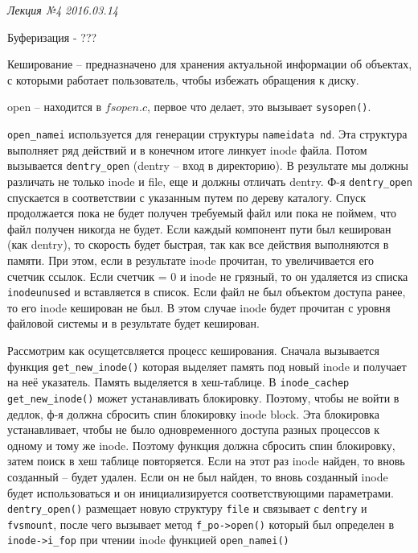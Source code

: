 \clearpage
\begin{flushright}
	\textit{Лекция №4}
	\textit{2016.03.14}
\end{flushright}

Буферизация - ???

Кеширование – предназначено для хранения актуальной информации об объектах, с которыми работает пользователь, чтобы избежать обращения к диску.

open – находится в $fsopen.c$, первое что делает, это вызывает \verb|sysopen()|. 

 

\verb|open_namei| используется для генерации структуры \verb|nameidata nd|. Эта структура выполняет ряд действий и в конечном итоге линкует inode файла. Потом вызывается \verb|dentry_open| (dentry – вход в директорию). В результате мы должны различать не только inode и file, еще и должны отличать dentry. Ф-я  \verb|dentry_open| спускается в соответствии с указанным путем по дереву каталогу. Спуск продолжается пока не будет получен требуемый файл или пока не поймем, что файл получен никогда не будет. Если каждый компонент пути был кеширован (как dentry), то скорость будет быстрая, так как все действия выполняются в памяти. При этом, если в результате inode прочитан, то увеличивается его счетчик ссылок. Если счетчик = 0 и inode не грязный, то он удаляется из списка \verb|inodeunused| и вставляется в список. Если файл не был объектом доступа ранее, то его inode кеширован не был. В этом случае inode будет прочитан с уровня файловой системы и в результате будет кеширован. 

Рассмотрим как осущетсвляется процесс кеширования. Сначала вызывается функция \verb|get_new_inode()|  которая выделяет память под новый inode и получает на неё указатель. Память выделяется в хеш-таблице. В \verb|inode_cachep| \verb|get_new_inode()| может устанавливать блокировку. Поэтому, чтобы не войти в дедлок, ф-я должна сбросить спин блокировку inode block. Эта блокировка устанавливает, чтобы не было одновременного доступа разных процессов к одному и тому же inode. Поэтому функция должна сбросить спин блокировку, затем поиск в хеш таблице повторяется. Если на этот раз inode найден, то вновь созданный – будет удален. Если он не был найден, то вновь созданный inode будет использоваться и он инициализируется соответствующими параметрами. 
\verb|dentry_open()| размещает новую структуру \verb|file| и связывает с \verb|dentry| и \verb|fvsmount|, после чего вызывает метод \verb|f_po->open()| который был определен в \verb|inode->i_fop| при чтении inode функцией \verb|open_namei()|

